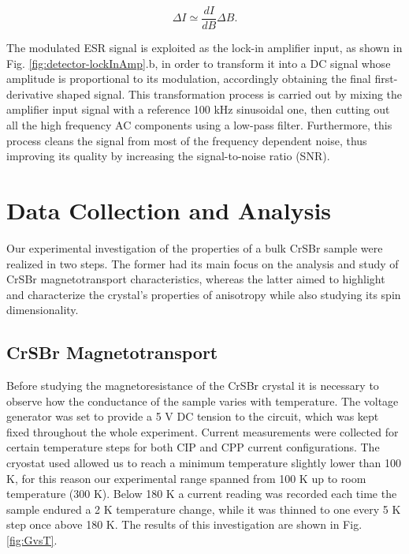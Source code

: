 \documentclass[journal]{IEEEtran}
\begin{document}
\begin{equation}
    \Delta I \simeq \frac{dI}{dB}\Delta B.
\end{equation}

\noindent The modulated ESR signal is exploited as the lock-in amplifier input, as shown in Fig. \ref{fig:detector-lockInAmp}.b, in order to transform it into a DC signal whose amplitude is proportional to its modulation, accordingly obtaining the final first-derivative shaped signal. This transformation process is carried out by mixing the amplifier input signal with a reference 100 kHz sinusoidal one, then cutting out all the high frequency AC components using a low-pass filter. Furthermore, this process cleans the signal from most of the frequency dependent noise, thus improving its quality by increasing the signal-to-noise ratio (SNR).

\section{Data Collection and Analysis}

Our experimental investigation of the properties of a bulk CrSBr sample were realized in two steps. The former had its main focus on the analysis and study of CrSBr magnetotransport characteristics, whereas the latter aimed to highlight and characterize the crystal's properties of anisotropy while also studying its spin dimensionality.

\subsection{CrSBr Magnetotransport}

Before studying the magnetoresistance of the CrSBr crystal it is necessary to observe how the conductance of the sample varies with temperature. The voltage generator was set to provide a 5 V DC tension to the circuit, which was kept fixed throughout the whole experiment. Current measurements were collected for certain temperature steps for both CIP and CPP current configurations. The cryostat used allowed us to reach a minimum temperature slightly lower than 100 K, for this reason our experimental range spanned from 100 K up to room temperature (300 K). Below 180 K a current reading was recorded each time the sample endured a 2 K temperature change, while it was thinned to one every 5 K step once above 180 K. The results of this investigation are shown in Fig. \ref{fig:GvsT}.
\end{document}
